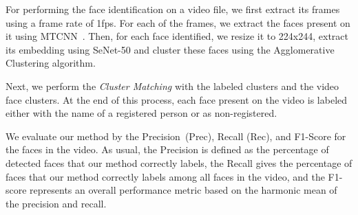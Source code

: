 For performing the face identification on a video file, we first extract its frames using a frame rate of 1fps.
For each of the frames, we extract the faces present on it using MTCNN~\cite{mtcnn}. 
Then, for each face identified, we resize it to 224x244, extract its embedding using SeNet-50 and cluster these faces using the Agglomerative Clustering algorithm.

Next, we perform the \emph{Cluster Matching} with the labeled clusters and the video face clusters.
At the end of this process, each face present on the video is labeled either with the name of a registered person or as non-registered.

We evaluate our method by the Precision~(Prec), Recall (Rec), and F1-Score for the faces in the video. 
As usual, the Precision is defined as the percentage of detected faces that our method correctly labels, 
the Recall gives the percentage of faces that our method correctly labels among all faces in the video, and 
the F1-score represents an overall performance metric based on the  harmonic mean of the precision and recall.
